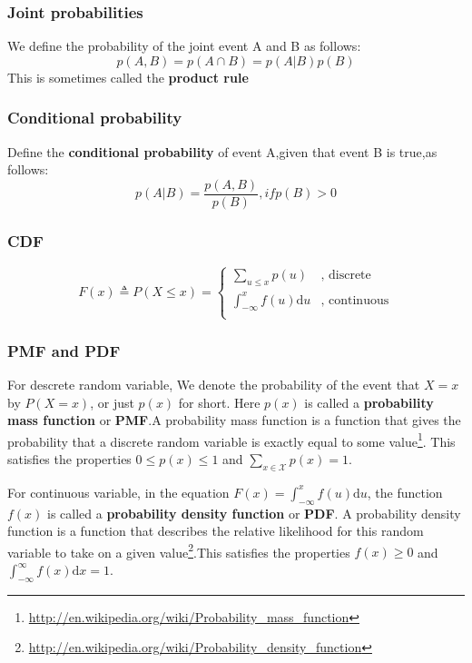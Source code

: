 \subsubsection{Joint probabilities}
We define the probability of the joint event A and B as follows:
\begin{equation}
p(A,B) = p(A\cap B) = p(A|B)p(B)
\end{equation}
This is sometimes called the \textbf{product rule}
\subsubsection{Conditional probability}
Define the \textbf{conditional probability} of event A,given that event B is true,as follows:
\begin{equation}
p(A|B)= \frac{p(A,B)}{p(B)},if p(B) > 0
\end{equation}
\subsubsection{CDF}

\begin{equation}
F(x) \triangleq P(X \leq x)=\begin{cases}
\sum_{u \leq x}p(u) & \text{, discrete}\\
\int_{-\infty}^{x} f(u)\mathrm{d}u & \text{, continuous}\\
\end{cases}
\end{equation}


\subsubsection{PMF and PDF}
For descrete random variable, We denote the probability of the event that $X=x$ by $P(X=x)$, or just $p(x)$ for short. Here $p(x)$ is called a \textbf{probability mass function} or \textbf{PMF}.A probability mass function is a function that gives the probability that a discrete random variable is exactly equal to some value\footnote{\url{http://en.wikipedia.org/wiki/Probability_mass_function}}. This satisfies the properties $0 \leq p(x) \leq 1$ and $\sum_{x \in \mathcal{X}} p(x)=1$.

For continuous variable, in the equation $F(x)=\int_{-\infty}^{x} f(u)\mathrm{d}u$, the function $f(x)$ is called a \textbf{probability density function} or \textbf{PDF}. A probability density function is a function that describes the relative likelihood for this random variable to take on a given value\footnote{\url{http://en.wikipedia.org/wiki/Probability_density_function}}.This satisfies the properties $f(x) \geq 0$ and $\int_{-\infty}^{\infty} f(x)\mathrm{d}x=1$.


